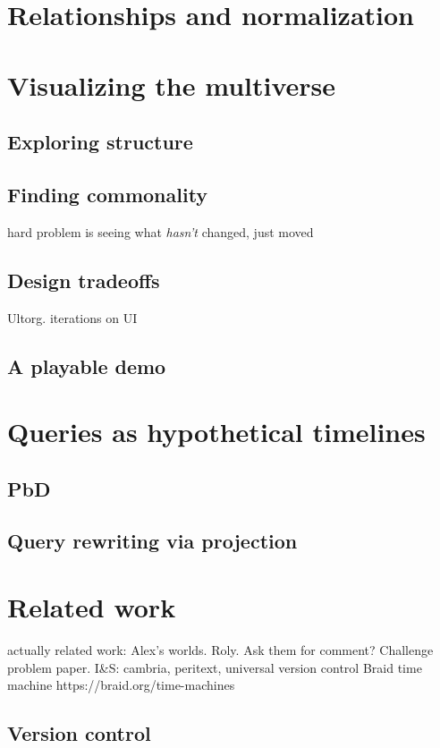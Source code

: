 \documentclass[english,submission]{programming}
\theoremstyle{definition}
\begin{document}
\section{Relationships and normalization}

\section{Visualizing the multiverse}
\subsection{Exploring structure}
\subsection{Finding commonality}
hard problem is seeing what \textit{hasn't} changed, just moved
\subsection{Design tradeoffs}
Ultorg.
iterations on UI
\subsection{A playable demo}

\section{Queries as hypothetical timelines}
\subsection{PbD}
\subsection{Query rewriting via projection}


\section{Related work}

actually related work:
Alex's worlds. Roly. Ask them for comment?
Challenge problem paper.
I\&S: cambria, peritext, universal version control
Braid time machine https://braid.org/time-machines

\subsection{Version control}\label{VC}
\end{document}
